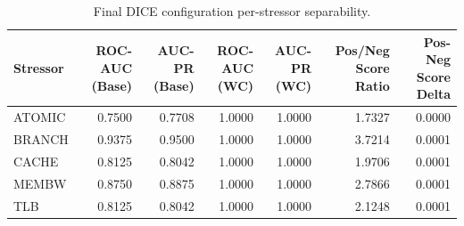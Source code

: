 \begin{table}[t]
\centering
\caption{Final DICE configuration per-stressor separability.}
\label{tab:dice_full_stressor}
\footnotesize
\begin{tabular}{lrrrrrr}
\toprule
Stressor & ROC-AUC (Base) & AUC-PR (Base) & ROC-AUC (WC) & AUC-PR (WC) & Pos/Neg Score Ratio & Pos-Neg Score Delta \\
\midrule
ATOMIC & 0.7500 & 0.7708 & 1.0000 & 1.0000 & 1.7327 & 0.0000 \\
BRANCH & 0.9375 & 0.9500 & 1.0000 & 1.0000 & 3.7214 & 0.0001 \\
CACHE & 0.8125 & 0.8042 & 1.0000 & 1.0000 & 1.9706 & 0.0001 \\
MEMBW & 0.8750 & 0.8875 & 1.0000 & 1.0000 & 2.7866 & 0.0001 \\
TLB & 0.8125 & 0.8042 & 1.0000 & 1.0000 & 2.1248 & 0.0001 \\
\bottomrule
\end{tabular}

\end{table}

